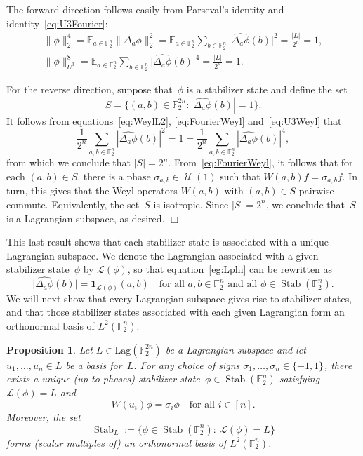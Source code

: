 \documentclass[11pt]{amsart}
\newcommand{\E}{\mathbb{E}}
\newcommand{\Lag}{\mathrm{Lag}}
\DeclareMathOperator{\Stab}{Stab}\DeclareMathOperator{\Spec}{Spec}
\newcommand{\F}{\mathbb{F}} %
\newcommand{\Lcal}{\mathcal{L}}
\newcommand{\pmset}[1]{\{-1,1\}^{#1}} %
\newcommand{\one}{\mathbf{1}}
\DeclareMathOperator{\U}{\mathcal{U}}
\theoremstyle{plain}
\newtheorem{proposition}[theorem]{Proposition}
\theoremstyle{definition}
\theoremstyle{remark}
\renewenvironment{proof}[1][]{
    	\begin{trivlist}
     	\item[\hspace{\labelsep}{\em\noindent Proof#1:\/}]}
     	{{\hfill$\Box$}
    	\end{trivlist}
  }
\begin{document}
\begin{proof}
The forward direction follows easily from Parseval's identity and identity~\eqref{eq:U3Fourier}:
\begin{align*}
    \|\phi\|_2^4 = \E_{a\in \F_2^n} \|\Delta_a\phi\|_2^2 = \E_{a\in \F_2^n} \sum_{b\in \F_2^n} \big|\widehat{\Delta_a\phi}(b)\big|^2 = \frac{|L|}{2^n} = 1, \\
    \|\phi\|_{U^3}^8 = \E_{a\in \F_2^n} \sum_{b\in \F_2^n} \big|\widehat{\Delta_a\phi}(b)\big|^4 = \frac{|L|}{2^n} = 1.
\end{align*}

For the reverse direction, suppose that~$\phi$ is a stabilizer state and define the set 
\begin{equation*}
    S = \big\{(a,b)\in \F_2^{2n} : |\widehat{\Delta_a\phi}(b)| = 1\big\}.
\end{equation*}
It follows from equations~\eqref{eq:WeylL2}, \eqref{eq:FourierWeyl} and~\eqref{eq:U3Weyl} that
$$\frac{1}{2^n} \sum_{a, b \in \F_2^n} |\widehat{\Delta_a\phi}(b)|^2 = 1 = \frac{1}{2^n} \sum_{a, b \in \F_2^n} |\widehat{\Delta_a\phi}(b)|^4,$$
from which we conclude that $|S| = 2^n$.
From~\eqref{eq:FourierWeyl}, it follows that for each $(a,b)\in S$, there is a phase $\sigma_{a,b}\in \U(1)$ such that $W(a,b)f = \sigma_{a,b}f$.
In turn, this gives that the Weyl operators $W(a,b)$ with $(a,b)\in S$ pairwise commute.
Equivalently, the set~$S$ is isotropic.
Since $|S|=2^n$, we conclude that~$S$ is a Lagrangian subspace, as desired.
\end{proof}

This last result shows that each stabilizer state is associated with a unique Lagrangian subspace.
We denote the Lagrangian associated with a given stabilizer state~$\phi$ by $\Lcal(\phi)$, so that equation~\eqref{eg:Lphi} can be rewritten as
$$\big|\widehat{\Delta_a\phi}(b)\big| = \one_{\Lcal(\phi)}(a,b) \quad \text{for all $a, b \in \F_2^n$ and all $\phi \in \Stab(\F_2^n)$.}$$
We will next show that every Lagrangian subspace gives rise to stabilizer states, and that those stabilizer states associated with each given Lagrangian form an orthonormal basis of $L^2(\F_2^n)$.

\begin{proposition} \label{prop:Lag_stab_basis}
    Let $L\in \Lag(\F_2^{2n})$ be a Lagrangian subspace and let $u_1,\dots,u_n\in L$ be a basis for~$L$.
    For any choice of signs $\sigma_1,\dots,\sigma_n\in \pmset{}$, there exists a unique (up to phases) stabilizer state~$\phi\in \Stab(\F_2^n)$ satisfying $\mathcal L(\phi) = L$ and
    $$W(u_i)\phi = \sigma_i\phi \quad \text{for all $i\in [n]$.}$$
    Moreover, the set
    $$\Stab_L := \big\{\phi\in \Stab(\F_2^n):\: \Lcal(\phi)=L\big\}$$
    forms (scalar multiples of) an orthonormal basis of $L^2(\F_2^n)$. 
\end{proposition}
\end{document}
